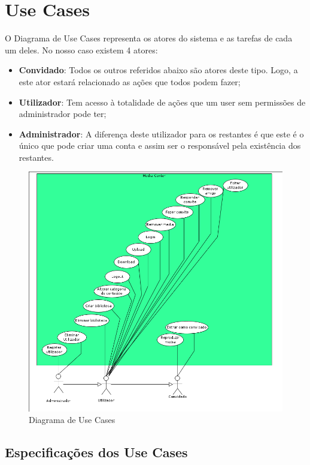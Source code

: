 \documentclass[a4paper]{report}
\begin{document}
\chapter{Use Cases}

O Diagrama de Use Cases representa os atores do sistema e as tarefas de cada um
deles. No nosso caso existem 4 atores:
\begin{itemize}
    \item \textbf{Convidado}: Todos os outros referidos abaixo são atores deste
        tipo. Logo, a este ator estará relacionado as ações que todos podem
        fazer;
    \item \textbf{Utilizador}: Tem acesso à totalidade de ações que um
        user sem permissões de administrador pode ter;
    \item \textbf{Administrador}: A diferença deste 
        utilizador para os restantes é que este é o único que pode criar uma
        conta e assim ser o responsável pela existência dos restantes.
\end{itemize}

\begin{figure}[H]
	\centering 
    \includegraphics[width=\textwidth]{images/UseCases.png}  
    \caption{Diagrama de Use Cases}
\end{figure}

\pagebreak

\section{Especificações dos Use Cases}
\end{document}
